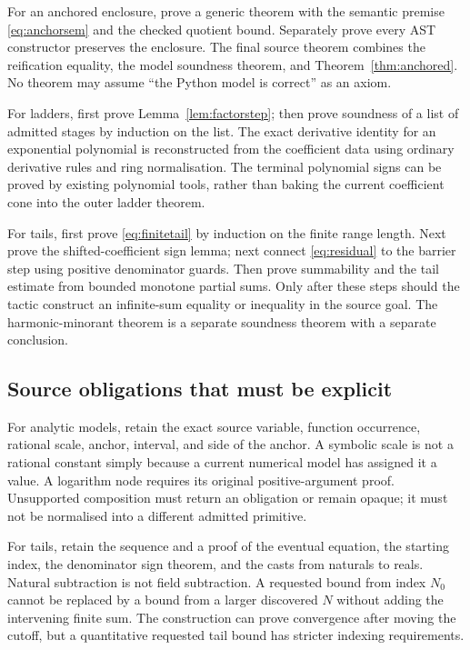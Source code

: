 \documentclass[11pt,a4paper]{article}
\theoremstyle{definition}\newtheorem{definition}[theorem]{Definition}
\begin{document}
For an anchored enclosure, prove a generic theorem with the semantic premise
\eqref{eq:anchorsem} and the checked quotient bound. Separately prove every AST
constructor preserves the enclosure. The final source theorem combines the
reification equality, the model soundness theorem, and
Theorem~\ref{thm:anchored}. No theorem may assume ``the Python model is
correct'' as an axiom.

For ladders, first prove Lemma~\ref{lem:factorstep}; then prove soundness of a
list of admitted stages by induction on the list. The exact derivative identity
for an exponential polynomial is reconstructed from the coefficient data using
ordinary derivative rules and ring normalisation. The terminal polynomial signs
can be proved by existing polynomial tools, rather than baking the current
coefficient cone into the outer ladder theorem.

For tails, first prove \eqref{eq:finitetail} by induction on the finite range
length. Next prove the shifted-coefficient sign lemma; next connect
\eqref{eq:residual} to the barrier step using positive denominator guards.
Then prove summability and the tail estimate from bounded monotone partial sums.
Only after these steps should the tactic construct an infinite-sum equality or
inequality in the source goal. The harmonic-minorant theorem is a separate
soundness theorem with a separate conclusion.

\subsection{Source obligations that must be explicit}

For analytic models, retain the exact source variable, function occurrence,
rational scale, anchor, interval, and side of the anchor. A symbolic scale is
not a rational constant simply because a current numerical model has assigned
it a value. A logarithm node requires its original positive-argument proof.
Unsupported composition must return an obligation or remain opaque; it must not
be normalised into a different admitted primitive.

For tails, retain the sequence and a proof of the eventual equation, the
starting index, the denominator sign theorem, and the casts from naturals to
reals. Natural subtraction is not field subtraction. A requested bound from
index $N_0$ cannot be replaced by a bound from a larger discovered $N$ without
adding the intervening finite sum. The construction can prove convergence after
moving the cutoff, but a quantitative requested tail bound has stricter indexing
requirements.
\end{document}
